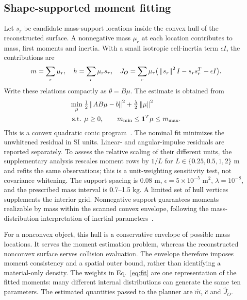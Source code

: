 \subsection{Shape-supported moment fitting}
Let $s_r$ be candidate mass-support locations inside the convex hull of the reconstructed surface. A nonnegative mass $\mu_r$ at each location contributes to mass, first moments and inertia. With a small isotropic cell-inertia term $\epsilon I$, the contributions are
\begin{equation}
 m=\sum_r\mu_r,\quad h=\sum_r\mu_rs_r,\quad
 J_O=\sum_r\mu_r\big(\left\lVert s_r\right\rVert^{2}I-s_rs_r^T+\epsilon I\big).
 \label{eq:support}
\end{equation}
Write these relations compactly as $\theta=B\mu$. The estimate is obtained from
\begin{equation}
 \begin{split}
 \min_{\mu}\;&\tfrac12\left\lVert AB\mu-b\right\rVert^{2}+\tfrac{\lambda}{2}\left\lVert\mu\right\rVert^{2}\\
 \text{s.t. }&\mu\geq0,\qquad m_{\min}\leq\mathbf{1}^{T}\mu\leq m_{\max}.
 \end{split}
 \label{eq:fit}
\end{equation}
This is a convex quadratic conic program~\cite{boyd2004}. The nominal fit minimizes the unwhitened residual in SI units. Linear- and angular-impulse residuals are reported separately. To assess the relative scaling of their different units, the supplementary analysis rescales moment rows by $1/L$ for $L\in\{0.25,0.5,1,2\}$ m and refits the same observations; this is a unit-weighting sensitivity test, not covariance whitening. The support spacing is 0.08 m, $\epsilon=5\times10^{-5}$ m$^2$, $\lambda=10^{-8}$, and the prescribed mass interval is 0.7--1.5 kg. A limited set of hull vertices supplements the interior grid. Nonnegative support guarantees moments realizable by mass within the scanned convex envelope, following the mass-distribution interpretation of inertial parameters~\cite{wensing2018}.

For a nonconvex object, this hull is a conservative envelope of possible mass locations. It serves the moment estimation problem, whereas the reconstructed nonconvex surface serves collision evaluation. The envelope therefore imposes moment consistency and a spatial outer bound, rather than identifying a material-only density. The weights in Eq.~\eqref{eq:fit} are one representation of the fitted moments: many different internal distributions can generate the same ten parameters. The estimated quantities passed to the planner are $\hat m$, $\hat c$ and $\hat J_O$.

